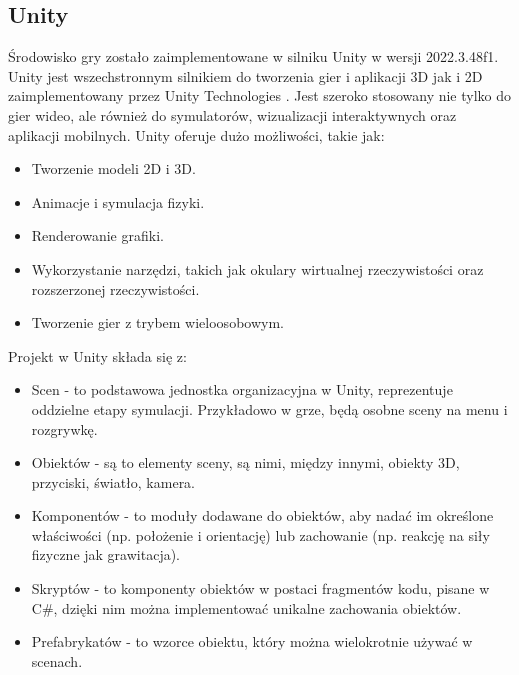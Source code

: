 \documentclass[a4paper,twoside,12pt]{book}
\begin{document}
	\subsection{Unity}
	 Środowisko gry zostało zaimplementowane w silniku Unity w wersji 2022.3.48f1.
	 Unity jest wszechstronnym silnikiem do tworzenia gier i aplikacji 3D jak i 2D zaimplementowany przez Unity Technologies \cite{bib:unity_opis}. Jest szeroko stosowany nie tylko do gier wideo, ale również do symulatorów, wizualizacji interaktywnych oraz aplikacji mobilnych. 
	 Unity oferuje dużo możliwości, takie jak:
	 \begin{itemize}
	 	\item Tworzenie modeli 2D i 3D.
	 	\item Animacje i symulacja fizyki.
	 	\item Renderowanie grafiki.
	 	\item Wykorzystanie narzędzi, takich jak okulary wirtualnej rzeczywistości oraz rozszerzonej rzeczywistości.
	 	\item Tworzenie gier z trybem wieloosobowym.
	 \end{itemize}
	Projekt w Unity składa się z:
	\begin{itemize}
		\item Scen - to podstawowa jednostka organizacyjna w Unity, reprezentuje oddzielne etapy symulacji. Przykładowo w grze, będą osobne sceny na menu i rozgrywkę.
		\item Obiektów - są to elementy sceny, są nimi, między innymi,  obiekty 3D, przyciski, światło, kamera.
		\item Komponentów - to moduły dodawane do obiektów, aby nadać im określone właściwości (np. położenie i orientację) lub zachowanie (np. reakcję na siły fizyczne jak grawitacja).
		\item Skryptów - to komponenty obiektów w postaci fragmentów kodu, pisane w C\#, dzięki nim można implementować unikalne zachowania obiektów.
		\item Prefabrykatów - to wzorce obiektu, który można wielokrotnie używać w scenach.
	\end{itemize}
	  
\end{document}
